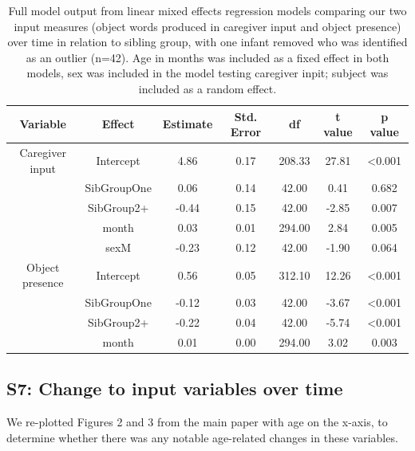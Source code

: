 \documentclass[
  man,mask,floatsintext]{apa6}
\begin{document}
\begin{longtable}[t]{ccccccc}
\caption{\label{tab:table-input-model-summary-red}Full model output from linear mixed effects regression models comparing our two input measures (object words produced in caregiver input and object presence) over time in relation to sibling group, with one infant removed who was identified as an outlier (n=42). Age in months was included as a fixed effect in both models, sex was included in the model testing caregiver inpit; subject was included as a random effect.}\\
\toprule
Variable & Effect & Estimate & Std. Error & df & t value & p value\\
\midrule
Caregiver input & Intercept & 4.86 & 0.17 & 208.33 & 27.81 & <0.001\\
 & SibGroupOne & 0.06 & 0.14 & 42.00 & 0.41 & 0.682\\
 & SibGroup2+ & -0.44 & 0.15 & 42.00 & -2.85 & 0.007\\
 & month & 0.03 & 0.01 & 294.00 & 2.84 & 0.005\\
 & sexM & -0.23 & 0.12 & 42.00 & -1.90 & 0.064\\
\midrule
\addlinespace
Object presence & Intercept & 0.56 & 0.05 & 312.10 & 12.26 & <0.001\\
 & SibGroupOne & -0.12 & 0.03 & 42.00 & -3.67 & <0.001\\
 & SibGroup2+ & -0.22 & 0.04 & 42.00 & -5.74 & <0.001\\
 & month & 0.01 & 0.00 & 294.00 & 3.02 & 0.003\\
\bottomrule
\end{longtable}
\newpage

\hypertarget{s7-change-to-input-variables-over-time}{%
\subsection{S7: Change to input variables over time}\label{s7-change-to-input-variables-over-time}}

We re-plotted Figures 2 and 3 from the main paper with age on the x-axis, to determine whether there was any notable age-related changes in these variables.
\end{document}
